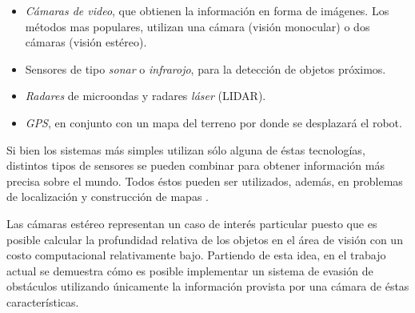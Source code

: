\documentclass[journal]{IEEEtran}
\begin{document}
\begin{itemize}
	\item \emph{C\'amaras de video}, que obtienen la informaci\'on en forma de im\'agenes. Los m\'etodos mas populares, utilizan una c\'amara (visi\'on monocular) o dos c\'amaras (visi\'on est\'ereo).
	
	\item Sensores de tipo \emph{sonar} o \emph{infrarojo}, para la detecci\'on de objetos pr\'oximos.
	
	\item \emph{Radares} de microondas y radares \emph{l\'aser} (LIDAR).

	\item \emph{GPS}, en conjunto con un mapa del terreno por donde se desplazar\'a el robot.
\end{itemize}

Si bien los sistemas m\'as simples utilizan s\'olo alguna de \'estas tecnolog\'ias, distintos tipos de sensores se pueden combinar para obtener informaci\'on m\'as precisa sobre el mundo. Todos \'estos pueden ser utilizados, adem\'as, en problemas de localizaci\'on y construcci\'on de mapas \cite{KNG10}.

Las c\'amaras est\'ereo representan un caso de inter\'es particular puesto que es posible calcular la profundidad relativa de los objetos en el \'area de visi\'on con un costo computacional relativamente bajo. Partiendo de esta idea, en el trabajo actual se demuestra c\'omo es posible implementar un sistema de evasi\'on de obst\'aculos utilizando \'unicamente la informaci\'on provista por una c\'amara de \'estas caracter\'isticas.
\end{document}
